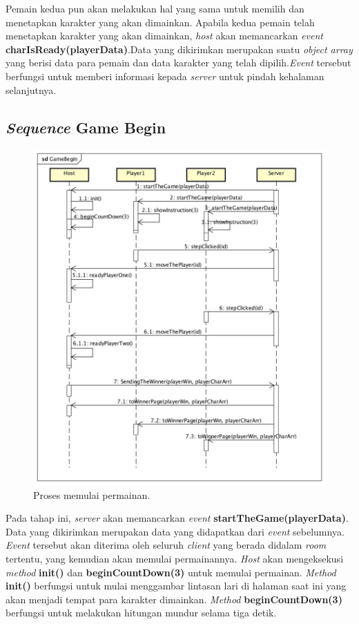 Pemain kedua pun akan melakukan hal yang sama untuk memilih dan menetapkan karakter yang akan dimainkan. Apabila kedua pemain telah menetapkan karakter yang akan dimainkan, \textit{host} akan memancarkan \textit{event} \textbf{charIsReady(playerData)}.Data yang dikirimkan merupakan suatu \textit{object array} yang berisi data para pemain dan data karakter yang telah dipilih.\textit{Event} tersebut berfungsi untuk memberi informasi kepada \textit{server} untuk pindah kehalaman selanjutnya.

\subsection{\textit{Sequence} Game Begin}

\begin{figure}[H]
	\centering
	\includegraphics[scale=0.3]{Gambar/GameBegin}
	\caption{Proses memulai permainan.}
	\label{fig:3_GameBegin}
\end{figure}

Pada tahap ini, \textit{server} akan memancarkan \textit{event} \textbf{startTheGame(playerData)}. Data yang dikirimkan merupakan data yang didapatkan dari \textit{event} sebelumnya. \textit{Event} tersebut akan diterima oleh seluruh \textit{client} yang berada didalam \textit{room} tertentu, yang kemudian akan memulai permainannya. \textit{Host} akan mengeksekusi \textit{method} \textbf{init()} dan \textbf{beginCountDown(3)} untuk memulai permainan. \textit{Method} \textbf{init()} berfungsi untuk mulai menggambar lintasan lari di halaman saat ini yang akan menjadi tempat para karakter dimainkan. \textit{Method} \textbf{beginCountDown(3)} berfungsi untuk melakukan hitungan mundur selama tiga detik. 

